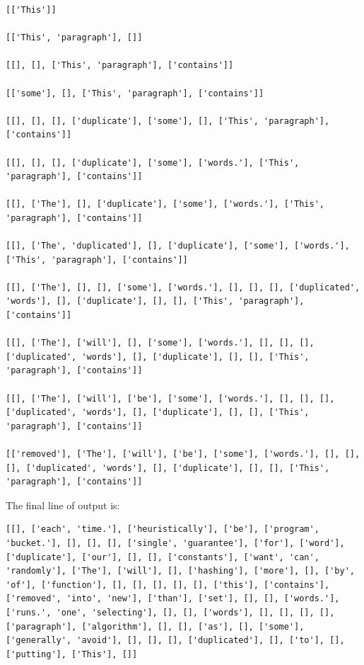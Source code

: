 \documentclass{book}
\begin{document}
\begin{lstlisting}[breaklines=true]
[['This']]

[['This', 'paragraph'], []]

[[], [], ['This', 'paragraph'], ['contains']]

[['some'], [], ['This', 'paragraph'], ['contains']]

[[], [], [], ['duplicate'], ['some'], [], ['This', 'paragraph'], ['contains']]

[[], [], [], ['duplicate'], ['some'], ['words.'], ['This', 'paragraph'], ['contains']]

[[], ['The'], [], ['duplicate'], ['some'], ['words.'], ['This', 'paragraph'], ['contains']]

[[], ['The', 'duplicated'], [], ['duplicate'], ['some'], ['words.'], ['This', 'paragraph'], ['contains']]

[[], ['The'], [], [], ['some'], ['words.'], [], [], [], ['duplicated', 'words'], [], ['duplicate'], [], [], ['This', 'paragraph'], ['contains']]

[[], ['The'], ['will'], [], ['some'], ['words.'], [], [], [], ['duplicated', 'words'], [], ['duplicate'], [], [], ['This', 'paragraph'], ['contains']]

[[], ['The'], ['will'], ['be'], ['some'], ['words.'], [], [], [], ['duplicated', 'words'], [], ['duplicate'], [], [], ['This', 'paragraph'], ['contains']]

[['removed'], ['The'], ['will'], ['be'], ['some'], ['words.'], [], [], [], ['duplicated', 'words'], [], ['duplicate'], [], [], ['This', 'paragraph'], ['contains']]
\end{lstlisting}

The final line of output is:

\begin{lstlisting}[breaklines=true]
[[], ['each', 'time.'], ['heuristically'], ['be'], ['program', 'bucket.'], [], [], [], ['single', 'guarantee'], ['for'], ['word'], ['duplicate'], ['our'], [], [], ['constants'], ['want', 'can', 'randomly'], ['The'], ['will'], [], ['hashing'], ['more'], [], ['by', 'of'], ['function'], [], [], [], [], [], ['this'], ['contains'], ['removed', 'into', 'new'], ['than'], ['set'], [], [], ['words.'], ['runs.', 'one', 'selecting'], [], [], ['words'], [], [], [], [], ['paragraph'], ['algorithm'], [], [], ['as'], [], ['some'], ['generally', 'avoid'], [], [], [], ['duplicated'], [], ['to'], [], ['putting'], ['This'], []]
\end{lstlisting}
\end{document}
